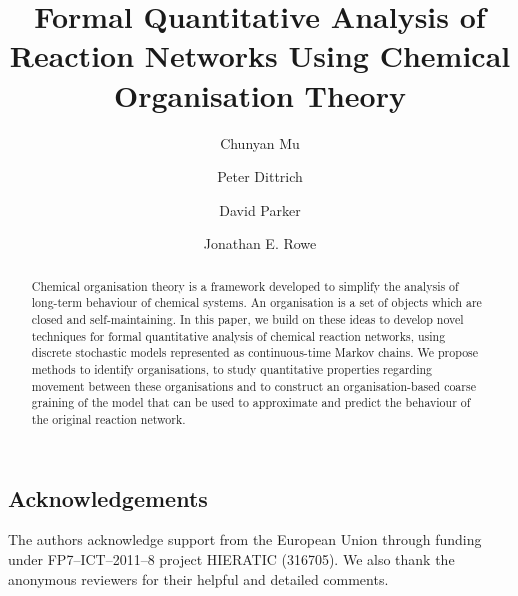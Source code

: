 \documentclass[a4paper,10pt]{llncs}
\begin{document}
\mainmatter  %

\title{Formal Quantitative Analysis of Reaction Networks 
      Using Chemical Organisation Theory}
\author{Chunyan Mu \and Peter Dittrich 
	\and David Parker \and Jonathan E. Rowe}

\maketitle

\begin{abstract}
Chemical organisation theory is a framework developed to simplify the
analysis of long-term behaviour of chemical systems. 
An organisation is a set of objects which are closed and self-maintaining. 
In this paper, we build on these ideas to develop novel techniques 
for formal quantitative analysis of chemical reaction networks, 
using discrete stochastic models represented as continuous-time Markov chains. 
We propose methods to identify organisations, 
to study quantitative properties regarding
movement between these organisations and to construct an
organisation-based coarse graining of the model that can be used to
approximate and predict the behaviour of the original reaction network.
\end{abstract}


  









\subsection*{Acknowledgements}
The authors acknowledge support from the European Union through funding  
under FP7–ICT–2011–8  project  HIERATIC (316705).
We also thank the anonymous reviewers for their helpful and detailed comments.  





\end{document}
